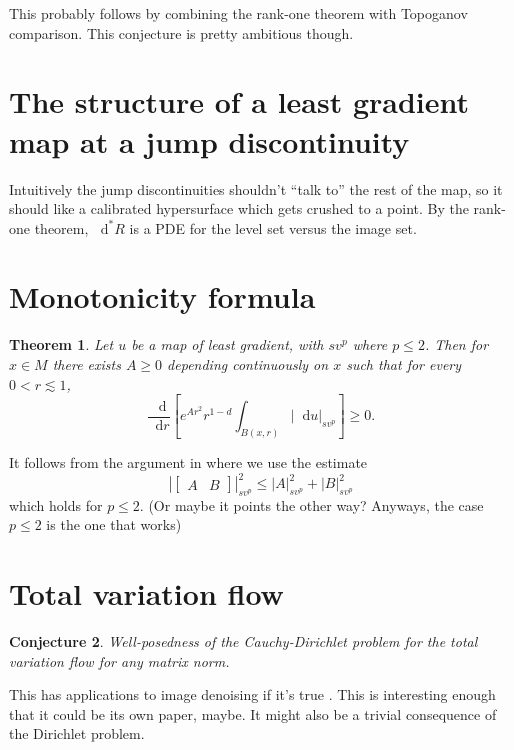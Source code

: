 \documentclass[reqno,11pt]{amsart}
\newcommand*\dif{\mathop{}\!\mathrm{d}}
\newtheorem{theorem}{Theorem}[section]
\newtheorem{conjecture}[theorem]{Conjecture}
\theoremstyle{definition}
\numberwithin{equation}{section}
\begin{document}
This probably follows by combining the rank-one theorem with Topoganov comparison.
This conjecture is pretty ambitious though.

\section{The structure of a least gradient map at a jump discontinuity}
Intuitively the jump discontinuities shouldn't ``talk to'' the rest of the map, so it should like a calibrated hypersurface which gets crushed to a point.
By the rank-one theorem, $\dif^* R$ is a PDE for the level set versus the image set.

\section{Monotonicity formula}
\begin{theorem}
Let $u$ be a map of least gradient, with $sv^p$ where $p \leq 2$.
Then for $x \in M$ there exists $A \geq 0$ depending continuously on $x$ such that for every $0 < r \lesssim 1$,
$$\frac{\dif}{\dif r} \left[e^{Ar^2} r^{1 - d} \int_{B(x, r)} |\dif u|_{sv^p}\right] \geq 0.$$
\end{theorem}

It follows from the argument in \cite{Miranda66} where we use the estimate 
$$\left|\begin{bmatrix}A & B\end{bmatrix}\right|_{sv^p}^2 \leq |A|_{sv^p}^2 + |B|_{sv^p}^2$$
which holds for $p \leq 2$. (Or maybe it points the other way? Anyways, the case $p \leq 2$ is the one that works)


\section{Total variation flow}
\begin{conjecture}
Well-posedness of the Cauchy-Dirichlet problem for the total variation flow for any matrix norm.
\end{conjecture}

This has applications to image denoising if it's true \cite{GórnyMazón+2022}.
This is interesting enough that it could be its own paper, maybe.
It might also be a trivial consequence of the Dirichlet problem.

\printbibliography
\end{document}

